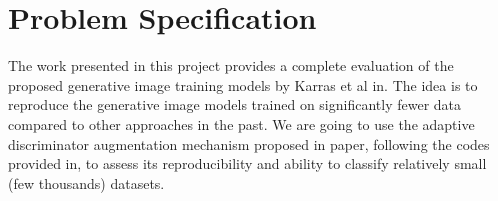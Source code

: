 \documentclass{report}
\begin{document}
\section{Problem Specification}


The work presented in this project provides a complete evaluation of the proposed generative image training models by Karras et al in\cite{karras2020training}. The idea is to reproduce the generative image models trained on significantly fewer data compared to other approaches in the past. We are going to use the adaptive discriminator augmentation mechanism proposed in paper, following the codes provided in\cite{karras2020training}, to assess its reproducibility and ability to classify relatively small (few thousands) datasets.\\
\end{document}
